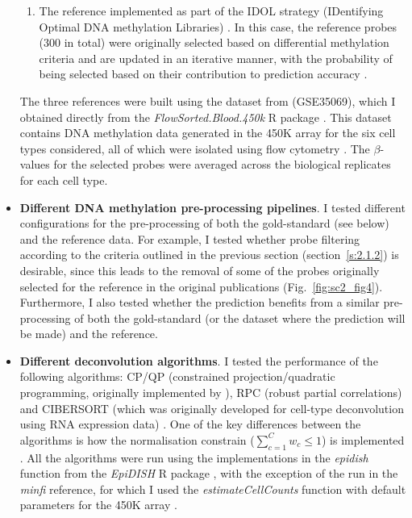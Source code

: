 \begin{itemize}
\begin{enumerate}
		\item The reference implemented as part of the \acrshort{IDOL} strategy (IDentifying Optimal DNA methylation Libraries) \citep{Koestler2016}. In this case, the reference probes (300 in total) were originally selected based on differential methylation criteria and are updated in an iterative manner, with the probability of being selected based on their contribution to prediction accuracy \citep{Koestler2016}.
	
	\end{enumerate}
	
	  The three references were built using the dataset from \citet{Reinius2012} (GSE35069), which I obtained directly from the \textit{FlowSorted.Blood.450k} R package \citep{Jaffe2018}. This dataset contains DNA methylation data generated in the 450K array for the six cell types considered, all of which were isolated using flow cytometry \citep{Reinius2012}. The $\beta$-values for the selected probes were averaged across the biological replicates for each cell type. 
	
	\item \textbf{Different DNA methylation pre-processing pipelines}. I tested different configurations for the pre-processing of both the gold-standard (see below) and the reference data. For example, I tested whether probe filtering according to the criteria outlined in the previous section (section~\ref{s:2.1.2}) is desirable, since this leads to the removal of some of the probes originally selected for the reference in the original publications \citep{Teschendorff2017a,Koestler2016} (Fig.~\ref{fig:sc2_fig4}). Furthermore, I also tested whether the prediction benefits from a similar pre-processing of both the gold-standard (or the dataset where the prediction will be made) and the reference.
		
	\item \textbf{Different deconvolution algorithms}. I tested the performance of the following algorithms: CP/QP (constrained projection/quadratic programming, originally implemented by \citet{Houseman2012}), RPC (robust partial correlations) \citep{Teschendorff2017a} and CIBERSORT (which was originally developed for cell-type deconvolution using RNA expression data) \citep{Teschendorff2017a,Newman2015}. One of the key differences between the algorithms is how the normalisation constrain ($\sum_{c=1}^{C} w_c \leq 1$) is implemented \citep{Teschendorff2017a}. All the algorithms were run using the implementations in the \textit{epidish} function from the \textit{EpiDISH} R package \citep{Teschendorff2017b}, with the exception of the run in the \textit{minfi} reference, for which I used the \textit{estimateCellCounts} function with default parameters for the 450K array \citep{Aryee2014}. 

\end{itemize}

